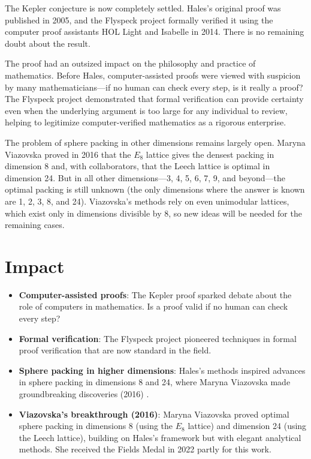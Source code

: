 The Kepler conjecture is now completely settled. Hales's original proof was published in 2005, and the Flyspeck project formally verified it using the computer proof assistants HOL Light and Isabelle in 2014. There is no remaining doubt about the result.

The proof had an outsized impact on the philosophy and practice of mathematics. Before Hales, computer-assisted proofs were viewed with suspicion by many mathematicians---if no human can check every step, is it really a proof? The Flyspeck project demonstrated that formal verification can provide certainty even when the underlying argument is too large for any individual to review, helping to legitimize computer-verified mathematics as a rigorous enterprise.

The problem of sphere packing in other dimensions remains largely open. Maryna Viazovska proved in 2016 that the $E_8$ lattice gives the densest packing in dimension 8 and, with collaborators, that the Leech lattice is optimal in dimension 24. But in all other dimensions---3, 4, 5, 6, 7, 9, and beyond---the optimal packing is still unknown (the only dimensions where the answer is known are 1, 2, 3, 8, and 24). Viazovska's methods rely on even unimodular lattices, which exist only in dimensions divisible by 8, so new ideas will be needed for the remaining cases.

\section{Impact}

\begin{itemize}
\item \textbf{Computer-assisted proofs}: The Kepler proof sparked debate about the role of computers in mathematics. Is a proof valid if no human can check every step?
\item \textbf{Formal verification}: The Flyspeck project pioneered techniques in formal proof verification that are now standard in the field.
\item \textbf{Sphere packing in higher dimensions}: Hales's methods inspired advances in sphere packing in dimensions 8 and 24, where Maryna Viazovska made groundbreaking discoveries (2016) \cite{viazovska2017,cohn2017}.
\item \textbf{Viazovska's breakthrough (2016)}: Maryna Viazovska proved optimal sphere packing in dimensions 8 (using the $E_8$ lattice) and dimension 24 (using the Leech lattice), building on Hales's framework but with elegant analytical methods. She received the Fields Medal in 2022 partly for this work.
\end{itemize}

